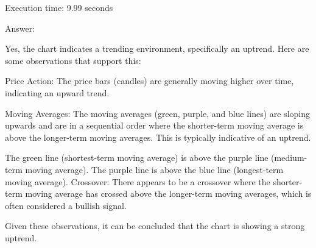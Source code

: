 Execution time: 9.99 seconds

Answer:

Yes, the chart indicates a trending environment, specifically an uptrend. Here are some observations that support this:

Price Action: The price bars (candles) are generally moving higher over time, indicating an upward trend.

Moving Averages: The moving averages (green, purple, and blue lines) are sloping upwards and are in a sequential order where the shorter-term moving average is above the longer-term moving averages. This is typically indicative of an uptrend.

The green line (shortest-term moving average) is above the purple line (medium-term moving average).
The purple line is above the blue line (longest-term moving average).
Crossover: There appears to be a crossover where the shorter-term moving average has crossed above the longer-term moving averages, which is often considered a bullish signal.

Given these observations, it can be concluded that the chart is showing a strong uptrend.